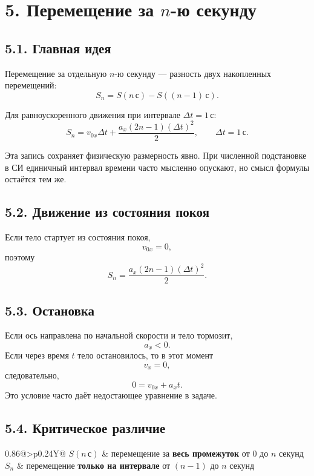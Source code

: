 \documentclass[a4paper,12pt]{article}
\newcommand{\formula}[1]{\[\displaystyle #1\]}
\newcommand{\unit}[1]{\,\text{#1}}
\begin{document}
\normalsize
\clearpage

\section*{5. Перемещение за $n$-ю секунду}
\small

\subsection*{5.1. Главная идея}
Перемещение за отдельную $n$-ю секунду --- разность двух накопленных перемещений:
\formula{\boxed{S_n=S(n\,\text{с})-S((n-1)\,\text{с})}.}

Для равноускоренного движения при интервале $\Delta t=1\unit{с}$:
\formula{\boxed{S_n=v_{0x}\Delta t+\frac{a_x(2n-1)(\Delta t)^2}{2}}, \qquad \Delta t=1\unit{с}.}

Эта запись сохраняет физическую размерность явно. При численной подстановке в СИ единичный интервал времени часто мысленно опускают, но смысл формулы остаётся тем же.

\subsection*{5.2. Движение из состояния покоя}
Если тело стартует из состояния покоя,
\formula{v_{0x}=0,}
поэтому
\formula{S_n=\frac{a_x(2n-1)(\Delta t)^2}{2}.}

\subsection*{5.3. Остановка}
Если ось направлена по начальной скорости и тело тормозит,
\formula{a_x<0.}
Если через время $t$ тело остановилось, то в этот момент
\formula{\boxed{v_x=0},}
следовательно,
\formula{0=v_{0x}+a_xt.}
Это условие часто даёт недостающее уравнение в задаче.

\subsection*{5.4. Критическое различие}
\begin{center}
\renewcommand{\arraystretch}{1.35}
\begin{tabularx}{0.86\linewidth}{@{}>{\bfseries}p{0.24\linewidth}Y@{}}
\toprule
$S(n\,\text{с})$ & перемещение за \textbf{весь промежуток} от $0$ до $n$ секунд \\
$S_n$ & перемещение \textbf{только на интервале} от $(n-1)$ до $n$ секунд \\
\bottomrule
\end{tabularx}
\end{center}
\end{document}

